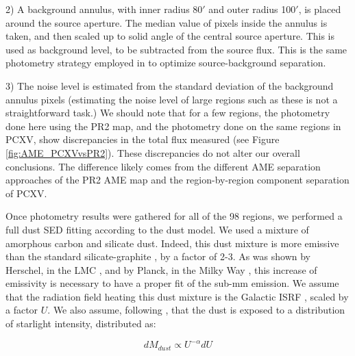 \documentclass[preprint2,longabstract]{aastex}
\begin{document}
     2) A background annulus, with inner radius 80$'$ and outer radius 100$'$, is placed around the source aperture. The median value of pixels inside the annulus is taken, and then scaled up to solid angle of the central source aperture. This is used as background level, to be subtracted from the source flux. This is the same photometry strategy employed in \cite{planckXV} to optimize source-background separation.

     3) The noise level is estimated from the standard deviation of the background annulus pixels (estimating the noise level of large regions such as these is not a straightforward task.) We should note that for a few regions, the photometry done here using the PR2 map, and the photometry done on the same regions in PCXV, show discrepancies in the total flux measured (see Figure \ref{fig:AME_PCXVvsPR2}). These discrepancies do not alter our overall conclusions. The difference likely comes from the different AME separation approaches of the PR2 AME map and the region-by-region component separation of PCXV.

     Once photometry results were gathered for all of the 98 regions, we performed a full dust SED fitting according to the \cite{galliano11} dust model. We used a mixture of amorphous carbon and silicate dust. Indeed, this dust mixture is more emissive than the standard silicate-graphite \citep{draine07}, by a factor of 2-3. As was shown by Herschel, in the LMC \citep{galliano11}, and by Planck, in the Milky Way \citep{planck16}, this increase of emissivity is necessary to have a proper fit of the sub-mm emission. We assume that the radiation field heating this dust mixture is the Galactic ISRF \citep{math83}, scaled by a factor $U$. We also assume, following \cite{dale01}, that the dust is exposed to a distribution of starlight intensity, distributed as:

    \begin{equation}
        \label{eq:U}
          dM_{dust}\propto{} U^{-\alpha}dU
     \end{equation}
\end{document}
